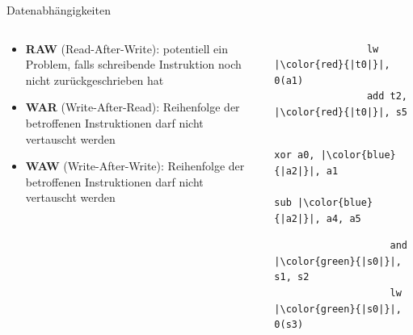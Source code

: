 \begin{frame}[fragile, c]{Datenabhängigkeiten}{}
	\begin{columns}
		\begin{column}[c]{0.5\textwidth}
			\begin{itemize}
				\item<1-> \textbf{RAW} (Read-After-Write): potentiell ein Problem, falls schreibende Instruktion noch nicht zurückgeschrieben hat
				\item<2-> \textbf{WAR} (Write-After-Read): Reihenfolge der betroffenen Instruktionen darf nicht vertauscht werden
				\item<3-> \textbf{WAW} (Write-After-Write): Reihenfolge der betroffenen Instruktionen darf nicht vertauscht werden
			\end{itemize}
		\end{column}%
		\begin{column}[c]{0.5\textwidth}
			\begin{listing}[H]
				\centering
				\begin{minipage}{\widthof{\texttt{add t2, t0, s5}}}
					\begin{verbatim}
				lw |\color{red}{|t0|}|, 0(a1)
				add t2, |\color{red}{|t0|}|, s5
			\end{verbatim}
				\end{minipage}
				\caption{RAW-Abhängigkeit bzgl. \texttt{t0}}
			\end{listing}
			\pause
			\begin{listing}[H]
				\centering
				\begin{minipage}{\widthof{\texttt{add t2, t0, s5}}}
					\begin{verbatim}
						xor a0, |\color{blue}{|a2|}|, a1
						sub |\color{blue}{|a2|}|, a4, a5
					\end{verbatim}
				\end{minipage}
				\caption{WAR-Abhängigkeit bzgl. \texttt{a2}}
			\end{listing}
			\pause
			\begin{listing}[H]
				\centering
				\begin{minipage}{\widthof{\texttt{add t2, t0, s5}}}
					\begin{verbatim}
					and |\color{green}{|s0|}|, s1, s2
					lw |\color{green}{|s0|}|, 0(s3)
				\end{verbatim}
				\end{minipage}
				\caption{WAW-Abhängigkeit bzgl. \texttt{s0}}
			\end{listing}
		\end{column}
	\end{columns}
\end{frame}

